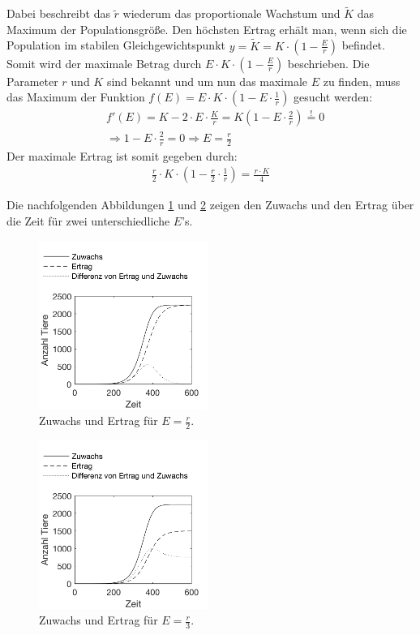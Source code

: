 \documentclass[a4paper,twoside]{article}
\begin{document}
	Dabei beschreibt das \(\tilde{r}\) wiederum das proportionale Wachstum und \(\tilde{K}\) das Maximum der Populationsgröße. Den höchsten Ertrag erhält man, wenn sich die Population im stabilen Gleichgewichtspunkt \(y = \tilde{K} = K \cdot \left(1 - \frac{E}{r}\right) \) befindet. Somit wird der maximale Betrag durch \(E \cdot K \cdot \left(1 - \frac{E}{r}\right)\) beschrieben. Die Parameter \(r\) und \(K\) sind bekannt und um nun das maximale \(E\) zu finden, muss das Maximum der Funktion \(f(E) = E \cdot K \cdot \left(1 - E \cdot \frac{1}{r}\right)\) gesucht werden:
	\begin{align*}
		&f'(E) = K - 2 \cdot E \cdot \frac{K}{r} = K \left(1 - E \cdot \frac{2}{r} \right) \stackrel{!}{=} 0 \\
		&\Rightarrow 1 - E \cdot \frac{2}{r} = 0 \Rightarrow E = \frac{r}{2}
	\end{align*}
	Der maximale Ertrag ist somit gegeben durch:
	\begin{align*}
		\frac{r}{2} \cdot K \cdot \left(1 - \frac{r}{2}\cdot\frac{1}{r}\right) = \frac{r \cdot K}{4}
	\end{align*}
	
	Die nachfolgenden Abbildungen \ref{fig:zuwachs_etrag_auf_zeit1} und \ref{fig:zuwachs_etrag_auf_zeit2} zeigen den Zuwachs und den Ertrag über die Zeit für zwei unterschiedliche \(E\)'s.
	\begin{figure}[!h]
  		\centering
 		\includegraphics[width=5.5cm]{Diagramme/zuwachs_etrag_auf_zeit1.png}
  		\caption{Zuwachs und Ertrag für \(E = \frac{r}{2}\).}
  		\label{fig:zuwachs_etrag_auf_zeit1}
	\end{figure}
	\begin{figure}[!h]
  		\centering
 		\includegraphics[width=5.5cm]{Diagramme/zuwachs_etrag_auf_zeit2.png}
  		\caption{Zuwachs und Ertrag für \(E = \frac{r}{3}\).}
  		\label{fig:zuwachs_etrag_auf_zeit2}
	\end{figure}
\end{document}
